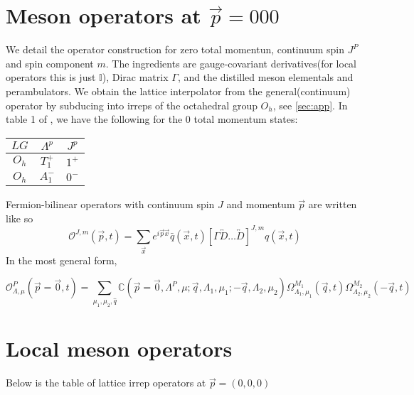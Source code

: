 \section{Meson operators at $\vec{p}=000$}
We detail the operator construction for zero total momentun, continuum spin $J^P$ and spin component $m$. The ingredients are gauge-covariant derivatives(for local operators this is just $\mathbb{I}$), Dirac matrix $\Gamma$, and the distilled meson elementals and perambulators. We obtain the lattice interpolator from the general(continuum) operator by subducing into irreps of the octahedral group $O_h$, see \ref{sec:app}. In table 1 of \cite{Cheung_2017}, we have the following for the 0 total momentum states: 
\begin{table}
    \begin{tabular}{ccc}
    $LG$ & $\Lambda^p$ & $J^p$ \\
    \hline
    $O_h$ & $T_1^+$ & $1^+$ \\
    $O_h$ & $A_1^-$ & $0^-$ \\
\end{tabular}
Fermion-bilinear operators with continuum spin $J$ and momentum $\vec{p}$ are written like so \cite{Cheung_2017}
    \begin{equation}
    \mathcal{O}^{J,m}(\vec{p},t) = \sum_{\vec{x}} e^{i\vec{p}\vec{x}} \bar{q}(\vec{x},t) [\Gamma \overleftrightarrow{D}\dots \overleftrightarrow{D}]^{J,m}q(\vec{x},t)
\end{equation}
In the most general form,

\begin{equation}
    \mathcal{O}_{\Lambda,\mu}^P(\vec{p}=\vec{0},t) = \sum_{\mu_1,\mu_2,\hat{q}} \mathbb{C}(\vec{p} = \vec{0},\Lambda^P,\mu;\vec{q},\Lambda_1,\mu_1;-\vec{q},\Lambda_2,\mu_2) \Omega^{M_1}_{\Lambda_1,\mu_1}(\vec{q},t) \Omega^{M_2}_{\Lambda_2,\mu_2}(-\vec{q},t)
\end{equation}

\section{Local meson operators}
Below is the table of lattice irrep operators at $\vec{p} = (0,0,0)$ \cite{Dudek_2008}


\end{table}

